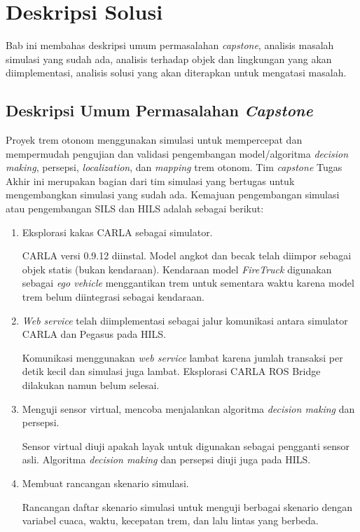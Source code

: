 \chapter{Deskripsi Solusi}
\label{chapter-3}

Bab ini membahas deskripsi umum permasalahan \textit{capstone}, analisis masalah
simulasi yang sudah ada, analisis terhadap objek dan lingkungan yang akan
diimplementasi, analisis solusi yang akan diterapkan untuk mengatasi masalah.

\section{Deskripsi Umum Permasalahan \textit{Capstone}}

Proyek trem otonom menggunakan simulasi untuk mempercepat dan mempermudah
pengujian dan validasi pengembangan model/algoritma \textit{decision making},
persepsi, \textit{localization}, dan \textit{mapping} trem otonom. Tim
\textit{capstone} Tugas Akhir ini merupakan bagian dari tim simulasi yang
bertugas untuk mengembangkan simulasi yang sudah ada. Kemajuan
pengembangan simulasi atau pengembangan SILS dan HILS adalah sebagai berikut:

\begin{enumerate}

	\item Eksplorasi kakas CARLA sebagai simulator.

	CARLA versi 0.9.12 diinstal. Model angkot dan becak telah diimpor
	sebagai objek statis (bukan kendaraan). Kendaraan model \textit{FireTruck}
	digunakan sebagai \textit{ego vehicle} menggantikan trem untuk sementara
	waktu karena model trem belum diintegrasi sebagai kendaraan.

	\item \textit{Web service} telah diimplementasi sebagai jalur komunikasi
	antara simulator CARLA dan Pegasus pada HILS.

	Komunikasi menggunakan \textit{web service} lambat karena jumlah transaksi
	per detik kecil dan simulasi juga lambat. Eksplorasi CARLA ROS Bridge
	dilakukan namun belum selesai.

	\item Menguji sensor virtual, mencoba menjalankan algoritma \textit{decision
	making} dan persepsi.

	Sensor virtual diuji apakah layak untuk digunakan sebagai pengganti sensor
	asli. Algoritma \textit{decision making} dan persepsi diuji juga pada HILS.

	\item Membuat rancangan skenario simulasi.

	Rancangan daftar skenario simulasi untuk menguji berbagai skenario dengan
	variabel cuaca, waktu, kecepatan trem, dan lalu lintas yang berbeda.

\end{enumerate}

